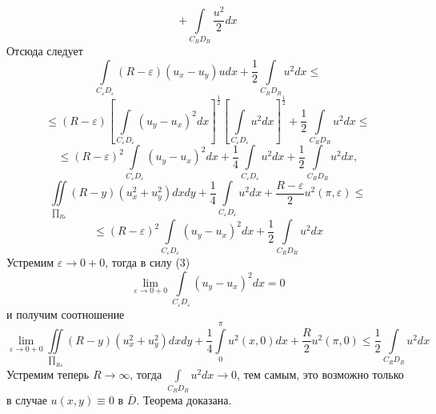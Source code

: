 \documentclass[a4paper, 9pt]{article}
\begin{document}
		\begin{equation*}
			+ \int\limits_{C_R D_R} \dfrac{u^2}{2}dx
		\end{equation*}
		Отсюда следует
		\begin{equation*}
			\int\limits_{C_\varepsilon D_\varepsilon} \left(R - \varepsilon \right) \left(u_x - u_y\right)u dx + \dfrac12  \int\limits_{C_R D_R} u^2 dx \leq
		\end{equation*}
		\begin{equation*}
			\leq \left(R - \varepsilon\right) \left[\int\limits_{C_\varepsilon D_\varepsilon} \left( u_y - u_x\right)^2 dx \right]^{\frac12} \left[\int\limits_{C_\varepsilon D_\varepsilon} u^2 dx \right]^{\frac12} + \dfrac12 \int\limits_{C_RD_R} u^2 dx \leq
		\end{equation*}
		\begin{equation*}
			\leq \left(R - \varepsilon\right)^2 \int\limits_{C_\varepsilon D_\varepsilon} \left( u_y - u_x\right)^2 dx + \dfrac14 \int\limits_{C_\varepsilon D_\varepsilon} u^2 dx +\dfrac12 \int\limits_{C_RD_R} u^2 dx, 
		\end{equation*}
		\begin{equation*}
			\iint\limits_{\prod_{R\varepsilon}} \left(R - y\right) \left(u_x^2 + u_y^2\right) dx dy + \dfrac{1}{4}\int\limits_{C_\varepsilon D_\varepsilon} u^2 dx +\dfrac{R - \varepsilon}{2}u^2(\pi, \varepsilon) \leq 
		\end{equation*}
		\begin{equation*}
			\leq \left(R - \varepsilon\right)^2 \int\limits_{C_\varepsilon D_\varepsilon} \left( u_y - u_x\right)^2 dx  +\dfrac12 \int\limits_{C_RD_R} u^2 dx
		\end{equation*}
		Устремим $\varepsilon \to 0 + 0$, тогда в силу (3)
		\begin{equation*}
			\lim\limits_{\varepsilon \to 0 + 0} \int\limits_{C_\varepsilon D_\varepsilon} \left(u_y - u_x\right)^2 dx = 0
		\end{equation*}
		и получим соотношение
		\begin{equation*}
			\lim\limits_{\varepsilon \to 0 + 0} \iint\limits_{\prod_{R\varepsilon}} \left(R - y\right) \left(u_x^2 + u_y^2 \right) dx dy + \dfrac14 \int\limits_0^\pi u^2(x,0) dx + \dfrac{R}{2}u^2(\pi,0) \leq \dfrac12 \int\limits_{C_RD_R} u^2 dx
		\end{equation*}
		Устремим теперь $R \to \infty$, тогда $\int\limits_{C_RD_R} u^2 dx \to 0$, тем самым, это возможно только в случае $u(x,y) \equiv 0$ в $\overline{D}$. Теорема доказана.
		\par
\end{document}
